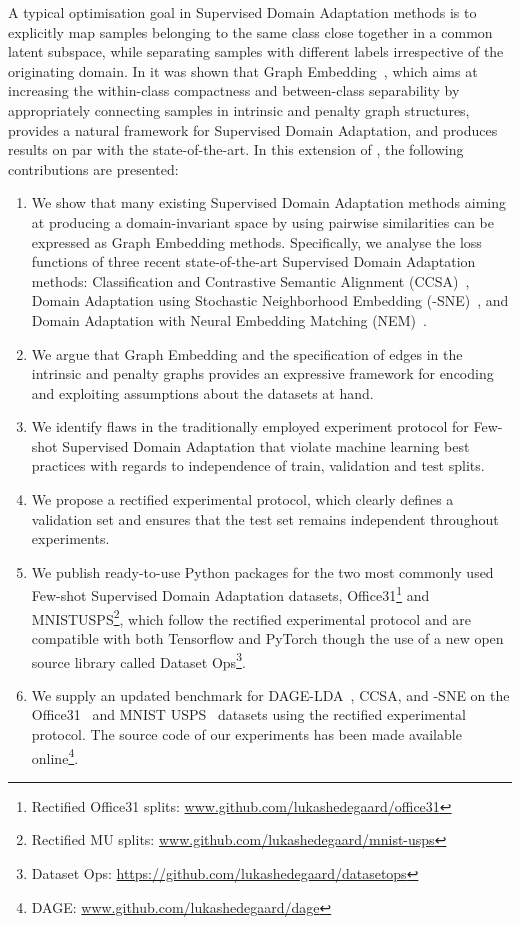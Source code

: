\documentclass[journal]{IEEEtran}
\begin{document}
A typical optimisation goal in Supervised Domain Adaptation methods is to explicitly map samples belonging to the same class close together in a common latent subspace, while separating samples with different labels irrespective of the originating domain. 
In \cite{hedegaard2020supervised} it was shown that Graph Embedding~\cite{yan2006mfa}, which aims at increasing the within-class compactness and between-class separability by appropriately connecting samples in intrinsic and penalty graph structures, provides a natural framework for Supervised Domain Adaptation, and produces results on par with the state-of-the-art. 
In this extension of \cite{hedegaard2020supervised}, the following contributions are presented:
\begin{enumerate}
    \item We show that many existing Supervised Domain Adaptation methods aiming at producing a domain-invariant space by using pairwise similarities can be expressed as Graph Embedding methods. Specifically, we analyse the loss functions of three recent state-of-the-art Supervised Domain Adaptation methods: Classification and Contrastive Semantic Alignment (CCSA)~\cite{motiian2017ccsa}, Domain Adaptation using Stochastic Neighborhood Embedding (-SNE)~\cite{xu2019dsne}, and Domain Adaptation with Neural Embedding Matching (NEM)~\cite{wang2019nem}.
    \item We argue that Graph Embedding and the specification of edges in the intrinsic and penalty graphs provides an expressive framework for encoding and exploiting assumptions about the datasets at hand.
    \item We identify flaws in the traditionally employed experiment protocol for Few-shot Supervised Domain Adaptation that violate machine learning best practices with regards to independence of train, validation and test splits.
    \item We propose a rectified experimental protocol, which clearly defines a validation set and ensures that the test set remains independent throughout experiments.
    \item We publish ready-to-use Python packages for the two most commonly used Few-shot Supervised Domain Adaptation datasets, Office31\footnote{Rectified Office31 splits: \url{www.github.com/lukashedegaard/office31}} and MNISTUSPS\footnote{Rectified MU splits: \url{www.github.com/lukashedegaard/mnist-usps}}, which follow the rectified experimental protocol and are compatible with both Tensorflow and PyTorch though the use of a new open source library called Dataset Ops\footnote{Dataset Ops: \url{https://github.com/lukashedegaard/datasetops}}.
    \item We supply an updated benchmark for DAGE-LDA~\cite{hedegaard2020supervised}, CCSA, and -SNE on the Office31~\cite{saenko2010adapting} and MNIST  USPS~\cite{lecun1998gradient,lecun90handwritten} datasets using the rectified experimental protocol. The source code of our experiments has been made available online\footnote{DAGE: \url{www.github.com/lukashedegaard/dage}}.
\end{enumerate}
\end{document}
